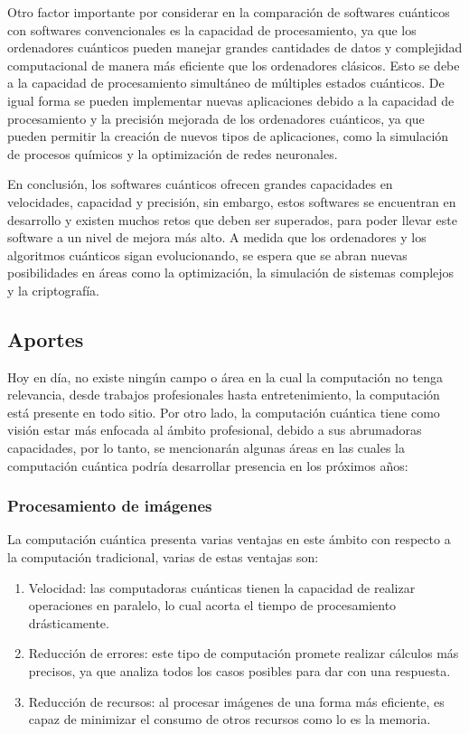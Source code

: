 \documentclass[twoside]{article}
\begin{document}
Otro factor importante por considerar en la comparación de softwares cuánticos con softwares convencionales es la capacidad de procesamiento, ya que los ordenadores cuánticos pueden manejar grandes cantidades de datos y complejidad computacional de manera más eficiente que los ordenadores clásicos. Esto se debe a la capacidad de procesamiento simultáneo de múltiples estados cuánticos. De igual forma se pueden implementar nuevas aplicaciones debido a la capacidad de procesamiento y la precisión mejorada de los ordenadores cuánticos, ya que pueden permitir la creación de nuevos tipos de aplicaciones, como la simulación de procesos químicos y la optimización de redes neuronales. 

En conclusión, los softwares cuánticos ofrecen grandes capacidades en velocidades, capacidad y precisión, sin embargo, estos softwares se encuentran en desarrollo y existen muchos retos que deben ser superados, para poder llevar este software a un nivel de mejora más alto. A medida que los ordenadores y los algoritmos cuánticos sigan evolucionando, se espera que se abran nuevas posibilidades en áreas como la optimización, la simulación de sistemas complejos y la criptografía. 

\subsection{Aportes}
Hoy en día, no existe ningún campo o área en la cual la computación no tenga relevancia, desde trabajos profesionales hasta entretenimiento, la computación está presente en todo sitio. Por otro lado, la computación cuántica tiene como visión estar más enfocada al ámbito profesional, debido a sus abrumadoras capacidades, por lo tanto, se mencionarán algunas áreas en las cuales la computación cuántica podría desarrollar presencia en los próximos años:

\subsubsection{Procesamiento de imágenes} 
La computación cuántica presenta varias ventajas en este ámbito con respecto a la computación tradicional, varias de estas ventajas son: 
\begin{enumerate}
    \item Velocidad: las computadoras cuánticas tienen la capacidad de realizar operaciones en paralelo, lo cual acorta el tiempo de procesamiento drásticamente.

    \item Reducción de errores: este tipo de computación promete realizar cálculos más precisos, ya que analiza todos los casos posibles para dar con una respuesta.

    \item Reducción de recursos: al procesar imágenes de una forma más eficiente, es capaz de minimizar el consumo de otros recursos como lo es la memoria.
\end{enumerate}
\end{document}
